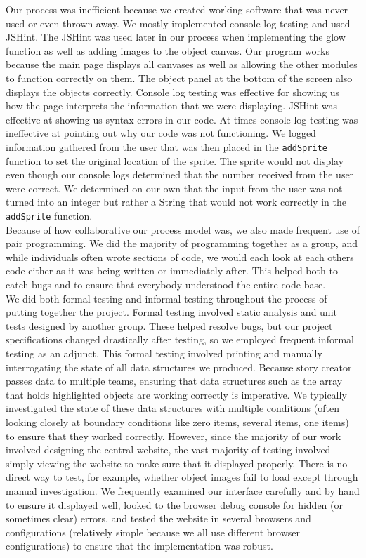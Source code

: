 \documentclass[12pt]{article}
\begin{document}
Our process was inefficient because we created working software that was never used or even thrown away.  We mostly implemented console log testing and used JSHint.  The JSHint was used later in our process when implementing the glow function as well as adding images to the object canvas.  Our program works because the main page displays all canvases as well as allowing the other modules to function correctly on them.  The object panel at the bottom of the screen also displays the objects correctly.  Console log testing was effective for showing us how the page interprets the information that we were displaying.  JSHint was effective at showing us syntax errors in our code.  At times console log testing was ineffective at pointing out why our code was not functioning.  We logged information gathered from the user that was then placed in the \texttt{addSprite} function to set the original location of the sprite.  The sprite would not display even though our console logs determined that the number received from the user were correct.  We determined on our own that the input from the user was not turned into an integer but rather a String that would not work correctly in the \texttt{addSprite} function.  \\

Because of how collaborative our process model was, we also made frequent use of pair programming. We did the majority of programming together as a group, and while individuals often wrote sections of code, we would each look at each others code either as it was being written or immediately after. This helped both to catch bugs and to ensure that everybody understood the entire code base. \\

We did both formal testing and informal testing throughout the process of putting together the project. Formal testing involved static analysis and unit tests designed by another group. These helped resolve bugs, but our project specifications changed drastically after testing, so we employed frequent informal testing as an adjunct. This formal testing involved printing and manually interrogating the state of all data structures we produced. Because story creator passes data to multiple teams, ensuring that data structures such as the array that holds highlighted objects are working correctly is imperative. We typically investigated the state of these data structures with multiple conditions (often looking closely at boundary conditions like zero items, several items, one items) to ensure that they worked correctly. However, since the majority of our work involved designing the central website, the vast majority of testing involved simply viewing the website to make sure that it displayed properly. There is no direct way to test, for example, whether object images fail to load except through manual investigation. We frequently examined our interface carefully and by hand to ensure it displayed well, looked to the browser debug console for hidden (or sometimes clear) errors, and tested the website in several browsers and configurations (relatively simple because we all use different browser configurations) to ensure that the implementation was robust. \\
\end{document}

